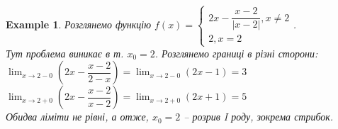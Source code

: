 \documentclass[a4paper, 14pt]{article}
\theoremstyle{theoremdd}
\theoremstyle{theoremdd}
\theoremstyle{theoremdd}
\theoremstyle{theoremdd}
\newtheorem{example}[theorem]{Example}
\theoremstyle{theoremdd}
\theoremstyle{theoremdd}
\theoremstyle{theoremdd}
\theoremstyle{theoremdd}
\begin{document}
\begin{example} Розглянемо функцію
$f(x) = \begin{cases} 
2x - \dfrac{x-2}{|x-2|}, x \neq 2 \\
2, x = 2
\end{cases}$.\\
Тут проблема виникає в т. $x_0 = 2$. Розглянемо границі в різні сторони:\\
$\displaystyle \lim_{x \to 2-0} \left(2x - \dfrac{x-2}{2-x}\right) = \lim_{x \to 2-0} (2x-1) = 3$\\
$\displaystyle \lim_{x \to 2+0} \left(2x - \dfrac{x-2}{x-2}\right) = \lim_{x \to 2+0} (2x+1) = 5$\\
Обидва ліміти не рівні, а отже, $x_0 = 2$ -- розрив I роду, зокрема стрибок.
\\ \iffalse %
\begin{figure}[H]
\centering
{
\begin{tikzpicture}[scale = 0.8]

\draw[thick, ->] (-2,0)--(4,0) node[anchor = north] {$x$};
\draw[thick, ->] (0,-3)--(0,6) node[anchor = east] {$y$};

\draw[thick, domain=-2:1.99, variable=\x, samples = 1000] plot({\x}, {2*\x - (\x-2)/(abs(\x-2))});
\draw[thick, domain= (2.01:3.5, variable=\x, samples = 1000] plot({\x}, {2*\x - (\x-2)/(abs(\x-2))}) node[anchor = south, scale = 0.8] {$f(x) = 2x - \dfrac{x-2}{|x-2|}$};
\node[white] at (2,5) [circle,fill,inner sep=1.5pt, draw = black]{};
\node[white] at (2,3) [circle,fill,inner sep=1.5pt, draw = black]{};
\draw[thick, dashed] (2,5)--(2,0) node[anchor = north] {$2$};
\draw (1 pt, 5cm) -- (-1 pt, 5cm) node[anchor = east] {$5$};
\draw (1 pt, 3cm) -- (-1 pt, 3cm) node[anchor = east] {$3$};
\draw (1 pt, 2cm) -- (-1 pt, 2cm) node[anchor = east] {$2$};
\fill(2,2) circle (2pt);
\end{tikzpicture}
}
\end{figure}
\fi %
\end{example}
\end{document}
